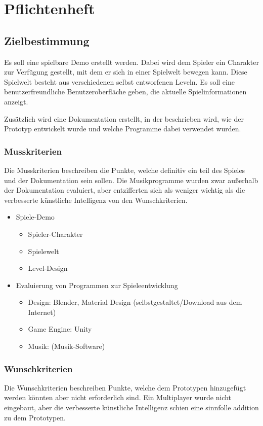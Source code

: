 \pagebreak
{}
\chapter{Pflichtenheft}
\section{Zielbestimmung}

Es soll eine spielbare Demo erstellt werden. Dabei wird dem Spieler ein Charakter zur Verfügung gestellt, mit dem er sich in einer Spielwelt bewegen kann. Diese Spielwelt besteht aus verschiedenen selbst entworfenen Leveln. Es soll eine benutzerfreundliche Benutzeroberfläche geben, die aktuelle Spielinformationen anzeigt.

Zusätzlich wird eine Dokumentation erstellt, in der beschrieben wird, wie der Prototyp entwickelt wurde und welche Programme dabei verwendet wurden.

\subsection{Musskriterien}
Die Musskriterien beschreiben die Punkte, welche definitiv ein teil des Spieles und der Dokumentation sein sollen. Die Musikprogramme wurden zwar außerhalb der Dokumentation evaluiert, aber entzifferten sich als weniger wichtig als die verbesserte künstliche Intelligenz von den Wunschkriterien.

\begin{itemize}
  \item Spiele-Demo
  \begin{itemize}
    \item Spieler-Charakter
    \item Spielewelt
    \item Level-Design
  \end{itemize}
  \item Evaluierung von Programmen zur Spieleentwicklung
  \begin{itemize}
    \item Design: Blender, Material Design (selbstgestaltet/Download aus dem Internet)
    \item Game Engine: Unity
    \item Musik: (Musik-Software)
  \end{itemize}
\end{itemize}

\pagebreak

\subsection{Wunschkriterien}
Die Wunschkriterien beschreiben Punkte, welche dem Prototypen hinzugefügt werden könnten aber nicht erforderlich sind. Ein Multiplayer wurde nicht eingebaut, aber die verbesserte künstliche Intelligenz schien eine sinnfolle addition zu dem Prototypen. 

